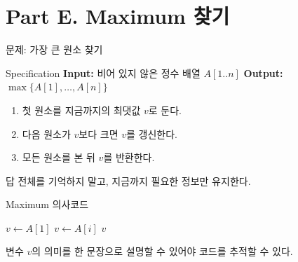 \section{Part E. Maximum 찾기}

\begin{frame}{문제: 가장 큰 원소 찾기}
  \begin{block}{Specification}
    \textbf{Input:} 비어 있지 않은 정수 배열 $A[1..n]$\quad
    \textbf{Output:} $\max\{A[1],\ldots,A[n]\}$
  \end{block}
  \begin{enumerate}
    \item 첫 원소를 지금까지의 최댓값 $v$로 둔다.
    \item 다음 원소가 $v$보다 크면 $v$를 갱신한다.
    \item 모든 원소를 본 뒤 $v$를 반환한다.
  \end{enumerate}
   답 전체를 기억하지 말고, 지금까지 필요한 정보만 유지한다.
\end{frame}

\begin{frame}[fragile]{Maximum 의사코드}
  \large
  \begin{algorithmic}[1]
      \State $v \gets A[1]$ 
          \State $v \gets A[i]$
        \EndIf
      \EndFor
      \State \Return $v$
    \EndProcedure
  \end{algorithmic}
  \vfill
  변수 $v$의 의미를 한 문장으로 설명할 수 있어야 코드를 추적할 수 있다.
\end{frame}

